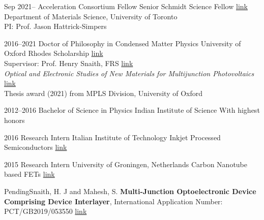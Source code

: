 \documentclass{scrartcl}
\begin{document}
\raggedright

\begin{entrylist}
\entry
{Sep 2021–}
{Acceleration Consortium Fellow}
{}
{Senior Schmidt Science Fellow \href{https://schmidtsciencefellows.org/fellow/suhas-mahesh/}{link}\\Department of Materials Science, University of Toronto\\PI: Prof. Jason Hattrick-Simpers}
\end{entrylist}


\begin{entrylist}
\entry
{2016--2021}
{Doctor of Philosophy in Condensed Matter Physics}
{University of Oxford}
{Rhodes Scholarship \href{https://www.rhodeshouse.ox.ac.uk/scholars/rhodes-scholars-class-of-2016/suhas-mahesh/}{link}\\
Supervisor: Prof. Henry Snaith, FRS \href{https://scholar.google.com/citations?user=I2D3pUMAAAAJ&hl=en}{link}\\
\emph{Optical and Electronic Studies of New Materials for Multijunction Photovoltaics }\href{http://dx.doi.org/10.5287/bodleian:mNArOK77N}{link}\\
Thesis award (2021) from MPLS Division, University of Oxford \\
}

\entry
{2012--2016}
{Bachelor of Science in Physics}
{Indian Institute of Science}
{With highest honors}

\entry
{2016}
{Research Intern}
{Italian Institute of Technology}
{Inkjet Processed Semiconductors \href{https://scholar.google.it/citations?user=f3suRUkAAAAJ&hl=en}{link}}

\entry
{2015}
{Research Intern}
{University of Groningen, Netherlands}
{Carbon Nanotube based FETs \href{https://scholar.google.com/citations?user=Cw22GB8AAAAJ&hl=en}{link}}
\end{entrylist}

\bigskip
{} %
\bigskip


\begin{entrylist}
\splitentry
{Pending}{Snaith, H. J and Mahesh, S. \textbf{Multi-Junction Optoelectronic Device Comprising Device Interlayer}, International Application Number: PCT/GB2019/053550 \href{https://patents.google.com/patent/WO2020120991A1/}{link} }{}

\end{entrylist} 
\end{document}
